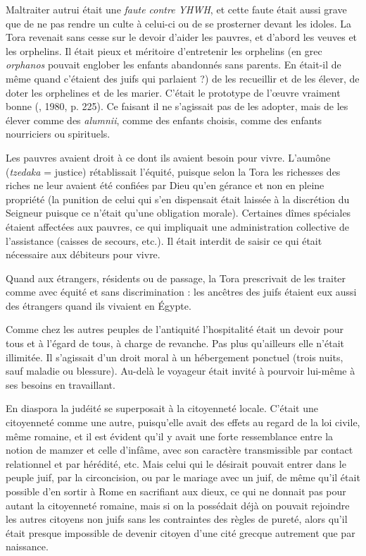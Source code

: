  Maltraiter autrui était une \emph{faute contre YHWH}, et cette faute était aussi grave que de ne pas rendre un culte à celui-ci ou de se prosterner devant les idoles. La Tora revenait sans cesse sur le devoir d'aider les pauvres, et d'abord les veuves et les orphelins. Il était pieux et méritoire d'entretenir les orphelins (en grec \emph{orphanos} pouvait englober les enfants abandonnés sans parents. En était-il de même quand c'étaient des juifs qui parlaient ?) de les recueillir et de les élever, de doter les orphelines et de les marier. C'était le prototype de l'œuvre vraiment bonne (, 1980, p. 225). Ce faisant il ne s'agissait pas de les adopter, mais de les élever comme des \emph{alumnii}, comme des enfants choisis, comme des enfants nourriciers ou spirituels. 

 Les pauvres avaient droit à ce dont ils avaient besoin pour vivre. L'aumône (\emph{tzedaka} = justice) rétablissait l'équité, puisque selon la Tora les richesses des riches ne leur avaient été confiées par Dieu qu'en gérance et non en pleine propriété (la punition de celui qui s'en dispensait était laissée à la discrétion du Seigneur puisque ce n'était qu'une obligation morale). Certaines dîmes spéciales étaient affectées aux pauvres, ce qui impliquait une administration collective de l'assistance (caisses de secours, etc.). Il était interdit de saisir ce qui était nécessaire aux débiteurs pour vivre. 

 Quand aux étrangers, résidents ou de passage, la Tora prescrivait de les traiter comme avec équité et sans discrimination : les ancêtres des juifs étaient eux aussi des étrangers quand ils vivaient en Égypte. 

 Comme chez les autres peuples de l'antiquité l'hospitalité était un devoir pour tous et à l'égard de tous, à charge de revanche. Pas plus qu'ailleurs elle n'était illimitée. Il s'agissait d'un droit moral à un hébergement ponctuel (trois nuits, sauf maladie ou blessure). Au-delà le voyageur était invité à pourvoir lui-même à ses besoins en travaillant. 

 En diaspora la judéité se superposait à la citoyenneté locale. C'était une citoyenneté comme une autre, puisqu'elle avait des effets au regard de la loi civile, même romaine, et il est évident qu'il y avait une forte ressemblance entre la notion de mamzer et celle d'infâme, avec son caractère transmissible par contact relationnel et par hérédité, etc. Mais celui qui le désirait pouvait entrer dans le peuple juif, par la circoncision, ou par le mariage avec un juif, de même qu'il était possible d'en sortir à Rome en sacrifiant aux dieux, ce qui ne donnait pas pour autant la citoyenneté romaine, mais si on la possédait déjà on pouvait rejoindre les autres citoyens non juifs sans les contraintes des règles de pureté, alors qu'il était presque impossible de devenir citoyen d'une cité grecque autrement que par naissance.

